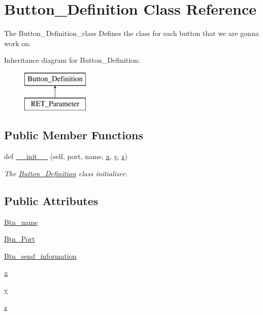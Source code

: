 \hypertarget{a00053}{}\section{Button\+\_\+\+Definition Class Reference}
\label{a00053}


The Button\+\_\+\+Definition\+\_\+class Defines the class for each button that we are gonna work on.  


Inheritance diagram for Button\+\_\+\+Definition\+:\begin{figure}[H]
\begin{center}
\leavevmode
\includegraphics[height=2.000000cm]{a00053}
\end{center}
\end{figure}
\subsection*{Public Member Functions}
\begin{DoxyCompactItemize}
\item 
def \hyperlink{a00053_a50fb78e452530651fd55f308c981e721}{\+\_\+\+\_\+init\+\_\+\+\_\+} (self, port, name, \hyperlink{a00053_a9336ebf25087d91c818ee6e9ec29f8c1}{x}, \hyperlink{a00053_a2fb1c5cf58867b5bbc9a1b145a86f3a0}{y}, \hyperlink{a00053_a25ed1bcb423b0b7200f485fc5ff71c8e}{z})
\begin{DoxyCompactList}\small\item\em The \hyperlink{a00053}{Button\+\_\+\+Definition} class initializer. \end{DoxyCompactList}\end{DoxyCompactItemize}
\subsection*{Public Attributes}
\begin{DoxyCompactItemize}
\item 
\hyperlink{a00053_aa3790d53320b232b4f09d282f73d8b2e}{Btn\+\_\+name}
\item 
\hyperlink{a00053_aff633e78cbd79e9aa272d02889df9ffe}{Btn\+\_\+\+Port}
\item 
\hyperlink{a00053_a002c2fe59897dc41e7fa1fce97472589}{Btn\+\_\+send\+\_\+information}
\item 
\hyperlink{a00053_a9336ebf25087d91c818ee6e9ec29f8c1}{x}
\item 
\hyperlink{a00053_a2fb1c5cf58867b5bbc9a1b145a86f3a0}{y}
\item 
\hyperlink{a00053_a25ed1bcb423b0b7200f485fc5ff71c8e}{z}
\end{DoxyCompactItemize}


